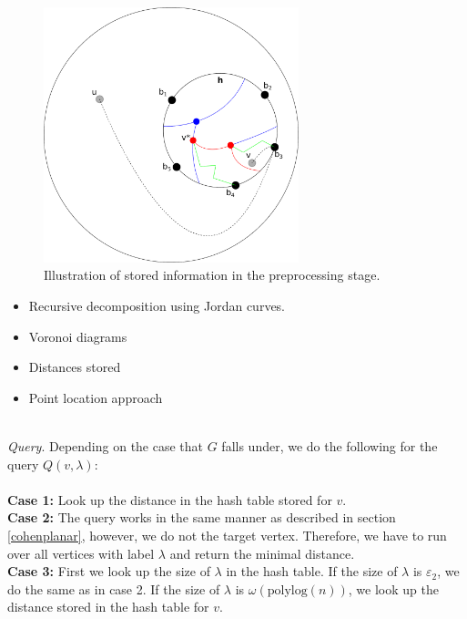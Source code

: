 \begin{figure}[h!]
  \centering
  \includegraphics[width=0.66\textwidth]{figs/vd1.pdf}
  \caption{Illustration of stored information in the preprocessing stage.}
    \label{vd1}
\end{figure}



 \begin{itemize}
  \item Recursive decomposition using Jordan curves.
  \item Voronoi diagrams
  \item Distances stored
  \item Point location approach
\end{itemize}
\noindent \\
\textit{Query}. Depending on the case that $G$ falls under, we do the following for the
query $Q(v, \lambda)$: \\
\\
\textbf{Case 1:} Look up the distance in the hash table stored for $v$. \\
\textbf{Case 2:} The query works in the same manner as described in section
\ref{cohenplanar}, however, we do not the target vertex. Therefore, we have to run over
all vertices with label $\lambda$ and return the minimal distance. \\
\textbf{Case 3:} First we look up the size of $\lambda$ in the hash table. If the size of
$\lambda$ is $\varepsilon_2$, we do the same as in case 2. If the size of $\lambda$ is
$\omega(\text{polylog}(n))$, we look up the distance stored in the hash table for $v$.

